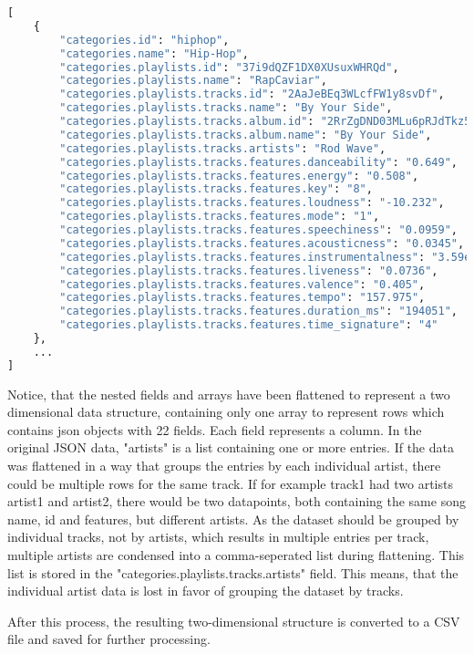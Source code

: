 \begin{lstlisting}[language=Python]
[
    {
        "categories.id": "hiphop",
        "categories.name": "Hip-Hop",
        "categories.playlists.id": "37i9dQZF1DX0XUsuxWHRQd",
        "categories.playlists.name": "RapCaviar",
        "categories.playlists.tracks.id": "2AaJeBEq3WLcfFW1y8svDf",
        "categories.playlists.tracks.name": "By Your Side",
        "categories.playlists.tracks.album.id": "2RrZgDND03MLu6pRJdTkz5",
        "categories.playlists.tracks.album.name": "By Your Side",
        "categories.playlists.tracks.artists": "Rod Wave",
        "categories.playlists.tracks.features.danceability": "0.649",
        "categories.playlists.tracks.features.energy": "0.508",
        "categories.playlists.tracks.features.key": "8",
        "categories.playlists.tracks.features.loudness": "-10.232",
        "categories.playlists.tracks.features.mode": "1",
        "categories.playlists.tracks.features.speechiness": "0.0959",
        "categories.playlists.tracks.features.acousticness": "0.0345",
        "categories.playlists.tracks.features.instrumentalness": "3.59e-05",
        "categories.playlists.tracks.features.liveness": "0.0736",
        "categories.playlists.tracks.features.valence": "0.405",
        "categories.playlists.tracks.features.tempo": "157.975",
        "categories.playlists.tracks.features.duration_ms": "194051",
        "categories.playlists.tracks.features.time_signature": "4"
    }, 
    ...
]
\end{lstlisting}

Notice, that the nested fields and arrays have been flattened to represent a two dimensional data structure,
containing only one array to represent rows which contains json objects with 22 fields. Each field represents
a column. In the original JSON data, "artists" is a list containing one or more entries. If the data was flattened
in a way that groups the entries by each individual artist, there could be multiple rows for the same track.
If for example track1 had two artists artist1 and artist2, there would be two datapoints, both containing the same
song name, id and features, but different artists. As the dataset should be grouped by individual tracks,
not by artists, which results in multiple entries per track, multiple artists are condensed into a comma-seperated
list during flattening. This list is stored in the "categories.playlists.tracks.artists" field.
This means, that the individual artist data is lost in favor of grouping the dataset by tracks.

After this process, the resulting two-dimensional structure is converted to a CSV file and saved for
further processing.